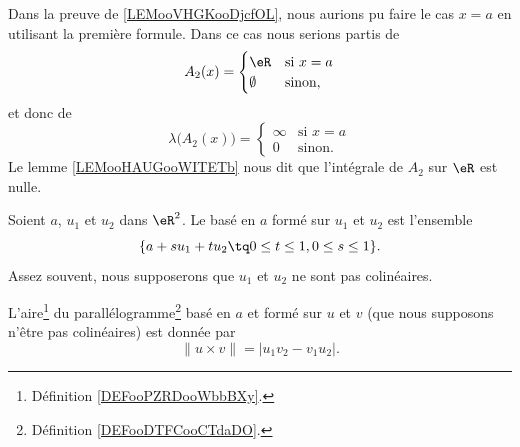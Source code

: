 \begin{remark}
	Dans la preuve de \ref{LEMooVHGKooDjcfOL}, nous aurions pu faire le cas \( x=a\) en utilisant la première formule. Dans ce cas nous serions partis de
	\begin{equation}
		A_2(x)=\begin{cases}
			\eR       & \text{si } x=a \\
			\emptyset & \text{sinon, }
		\end{cases}
	\end{equation}
	et donc de
	\begin{equation}
		\lambda\big( A_2(x) \big)=\begin{cases}
			\infty & \text{si } x=a \\
			0      & \text{sinon. }
		\end{cases}
	\end{equation}
	Le lemme \ref{LEMooHAUGooWITETb} nous dit que l'intégrale de \( A_2\) sur \( \eR\) est nulle.
\end{remark}


\begin{definition}      \label{DEFooDTFCooCTdaDO}
	Soient \( a\), \( u_1\) et \( u_2\) dans \( \eR^2\). Le  basé en \( a\) formé sur \( u_1\) et \( u_2\) est l'ensemble
	\begin{equation}
		\{ a+su_1+tu_2\tq 0\leq t\leq 1, 0\leq s\leq 1 \}.
	\end{equation}
	Assez souvent, nous supposerons que \( u_1\) et \( u_2\) ne sont pas colinéaires.
\end{definition}

\begin{proposition}     \label{PROPooAVVNooOOlSzr}
	L'aire\footnote{Définition \ref{DEFooPZRDooWbbBXy}.} du parallélogramme\footnote{Définition \ref{DEFooDTFCooCTdaDO}.}  basé en \( a\) et formé sur \( u\) et \( v\) (que nous supposons n'être pas colinéaires) est donnée par
	\begin{equation}
		\| u\times v \| =  | u_1v_2-v_1u_2 |.
	\end{equation}
\end{proposition}

